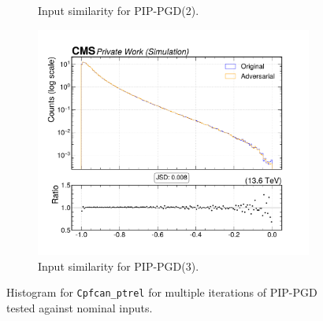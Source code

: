 \begin{figure}[htbp]
\begin{subfigure}[t]{0.32\textwidth}
    \caption*{Input similarity for PIP-PGD(2).}
  \end{subfigure}\hfill
  \begin{subfigure}[t]{0.32\textwidth}
    \includegraphics[width=\linewidth]{media/output/features/compare/combined_it_3/cmp_cpf_arr_Cpfcan_ptrel.pdf}
    \caption*{Input similarity for PIP-PGD(3).}
  \end{subfigure}

  \caption*{Histogram for \texttt{Cpfcan\_ptrel} for multiple iterations of PIP-PGD tested against nominal inputs.}
  \label{fig:combined_input_Cpfcan_ptrel}
\end{figure}

